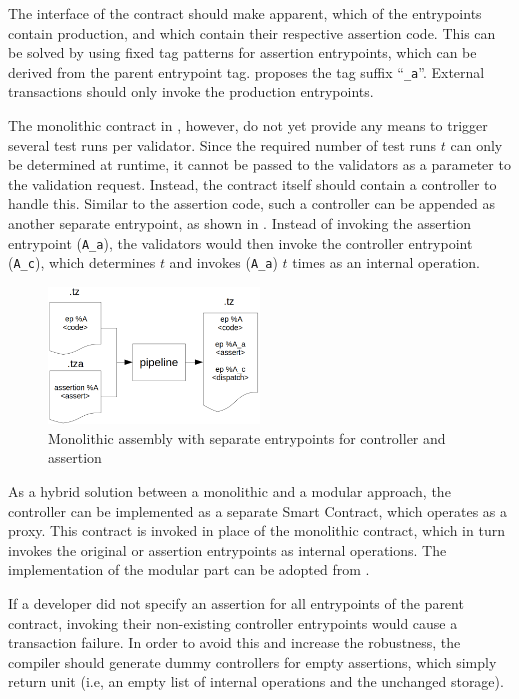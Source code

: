 The interface of the contract should make apparent, which of the entrypoints contain production, and which contain their respective assertion code. This can be solved by using fixed tag patterns for assertion entrypoints, which can be derived from the parent entrypoint tag.  proposes the tag suffix ``\texttt{\_a}''. External transactions should only invoke the production entrypoints.

The monolithic contract in , however, do not yet provide any means to trigger several test runs per validator. Since the required number of test runs $t$ can only be determined at runtime, it cannot be passed to the validators as a parameter to the validation request. Instead, the contract itself should contain a controller to handle this. Similar to the assertion code, such a controller can be appended as another separate entrypoint, as shown in . Instead of invoking the assertion entrypoint (\texttt{A\_a}), the validators would then invoke the controller entrypoint (\texttt{A\_c}), which determines $t$ and invokes (\texttt{A\_a}) $t$ times as an internal operation. 
\begin{figure}[h]
\centering
  \includegraphics[width=0.5\textwidth]{figures/5-offline_tezos/pipeline_output_mono_ep}
	\caption{Monolithic assembly with separate entrypoints for controller and assertion}
	\label{fig:monolithic_orchestration}
\end{figure}

As a hybrid solution between a monolithic and a modular approach, the controller can be implemented as a separate Smart Contract, which operates as a proxy. This contract is invoked in place of the monolithic contract, which in turn invokes the original or assertion entrypoints as internal operations. The implementation of the modular part can be adopted from .

If a developer did not specify an assertion for all entrypoints of the parent contract, invoking their non-existing controller entrypoints would cause a transaction failure. In order to avoid this and increase the robustness, the compiler should generate dummy controllers for empty assertions, which simply return unit (i.e, an empty list of internal operations and the unchanged storage).

